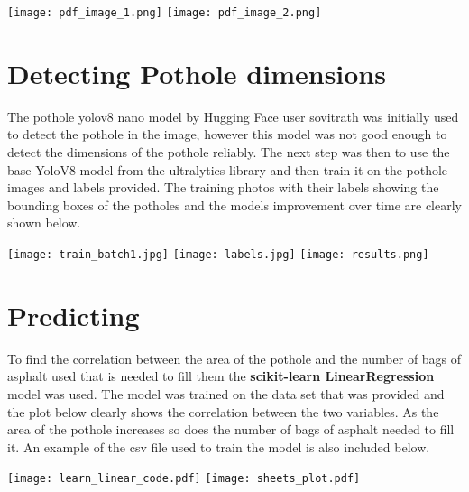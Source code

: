 \documentclass[8pt]{extarticle}
\begin{document}
\texttt{[image: pdf\_image\_1.png]}
\texttt{[image: pdf\_image\_2.png]}

\section{Detecting Pothole dimensions}

\vspace{10px}

The pothole yolov8 nano model by Hugging Face user sovitrath was initially used to detect the pothole in the image, however this model was not good enough to detect the dimensions of the pothole reliably.
The next step was then to use the base YoloV8 model from the ultralytics library and then train it on the pothole images and labels provided.
The training photos with their labels showing the bounding boxes of the potholes and the models improvement over time are clearly shown below.

\vspace{20px}

\texttt{[image: train\_batch1.jpg]}
\texttt{[image: labels.jpg]}
\texttt{[image: results.png]}

\section{Predicting}

\vspace{10px}

To find the correlation between the area of the pothole and the number of bags of asphalt used that is needed to fill them the \textbf{scikit-learn LinearRegression} model was used. The model was trained on the data set that was provided and the plot below clearly shows the correlation between the two variables. As the area of the pothole increases so does the number of bags of asphalt needed to fill it. An example of the csv file used to train the model is also included below.

\vspace{20px}

\texttt{[image: learn\_linear\_code.pdf]}
\texttt{[image: sheets\_plot.pdf]}
\end{document}
